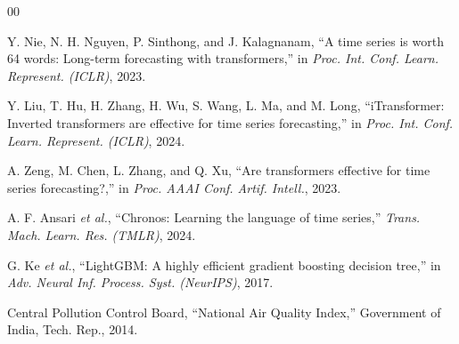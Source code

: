 \documentclass[conference]{IEEEtran}
\begin{document}
\begin{thebibliography}{00}

 Y. Nie, N. H. Nguyen, P. Sinthong, and J. Kalagnanam,
``A time series is worth 64 words: Long-term forecasting with transformers,''
in \emph{Proc. Int. Conf. Learn. Represent. (ICLR)}, 2023.

 Y. Liu, T. Hu, H. Zhang, H. Wu, S. Wang, L. Ma, and
M. Long, ``iTransformer: Inverted transformers are effective for time series
forecasting,'' in \emph{Proc. Int. Conf. Learn. Represent. (ICLR)}, 2024.

 A. Zeng, M. Chen, L. Zhang, and Q. Xu,
``Are transformers effective for time series forecasting?,''
in \emph{Proc. AAAI Conf. Artif. Intell.}, 2023.

 A. F. Ansari \emph{et al.},
``Chronos: Learning the language of time series,''
\emph{Trans. Mach. Learn. Res. (TMLR)}, 2024.

 G. Ke \emph{et al.},
``LightGBM: A highly efficient gradient boosting decision tree,''
in \emph{Adv. Neural Inf. Process. Syst. (NeurIPS)}, 2017.

 Central Pollution Control Board,
``National Air Quality Index,'' Government of India, Tech. Rep., 2014.

\end{thebibliography}
\end{document}

